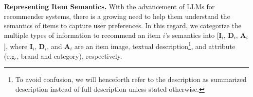 \documentclass[sigconf]{acmart}
\begin{document}
\smallskip
\noindent\textbf{Representing Item Semantics. }
With the advancement of LLMs for recommender systems, there is a growing need to help them understand the semantics of items to capture user preferences. In this regard, we categorize the multiple types of information to recommend an item $i$'s semantics into [$\mathbf{I}_i$, $\mathbf{D}_i$, $\mathbf{A}_i$], where $\mathbf{I}_i$, $\mathbf{D}_i$, and $\mathbf{A}_i$ are an item image, textual description\footnote{To avoid confusion, we will henceforth refer to the description as summarized description instead of full description unless stated otherwise.}, and attribute (e.g., brand and category), respectively. 
\end{document}
